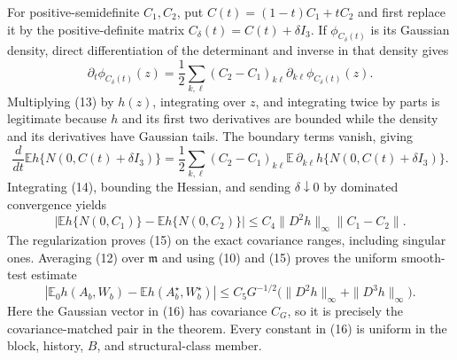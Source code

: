 For positive-semidefinite \(C_1,C_2\), put
\(
 C(t)=(1-t)C_1+tC_2
\)
and first replace it by the positive-definite matrix \(C_\delta(t)=C(t)+\delta I_3\).  If \(\phi_{C_\delta(t)}\) is its Gaussian density, direct differentiation of the determinant and inverse in that density gives
\[
 \partial_t\phi_{C_\delta(t)}(z)
 =\frac12\sum_{k,\ell}(C_2-C_1)_{k\ell}
       \partial_{k\ell}\phi_{C_\delta(t)}(z).                            \tag{13}
\]
Multiplying (13) by \(h(z)\), integrating over \(z\), and integrating twice by parts is legitimate because \(h\) and its first two derivatives are bounded while the density and its derivatives have Gaussian tails.  The boundary terms vanish, giving
\[
 \frac d{dt}\mathbb Eh\{N(0,C(t)+\delta I_3)\}
 =\frac12\sum_{k,\ell}(C_2-C_1)_{k\ell}
   \mathbb E\,\partial_{k\ell}h\{N(0,C(t)+\delta I_3)\}.               \tag{14}
\]
Integrating (14), bounding the Hessian, and sending \(\delta\downarrow0\) by dominated convergence yields
\[
 |\mathbb Eh\{N(0,C_1)\}-\mathbb Eh\{N(0,C_2)\}|
 \leq C_4\|D^2h\|_\infty\|C_1-C_2\|.                                 \tag{15}
\]
The regularization proves (15) on the exact covariance ranges, including singular ones.  Averaging (12) over \(\mathfrak m\) and using (10) and (15) proves the uniform smooth-test estimate
\[
 \left|\mathbb E_0h(A_b,W_b)-\mathbb Eh(A_b^\star,W_b^\star)\right|
 \leq C_5G^{-1/2}
       \bigl(\|D^2h\|_\infty+\|D^3h\|_\infty\bigr).                   \tag{16}
\]
Here the Gaussian vector in (16) has covariance \(C_G\), so it is precisely the covariance-matched pair in the theorem.  Every constant in (16) is uniform in the block, history, \(B\), and structural-class member.

